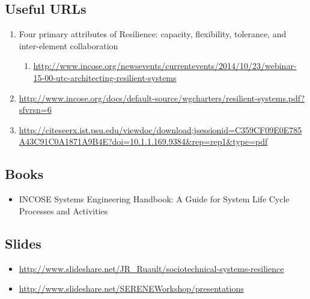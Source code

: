 \documentclass[11pt]{article}
\begin{document}
\subsection{Useful URLs}
\begin{enumerate}
	\item Four primary attributes of Resilience: capacity, flexibility, tolerance, and inter-element collaboration
	\begin{enumerate}
		\item \url{http://www.incose.org/newsevents/currentevents/2014/10/23/webinar-15-00-utc-architecting-resilient-systems}
	\end{enumerate}
	\item \url{http://www.incose.org/docs/default-source/wgcharters/resilient-systems.pdf?sfvrsn=6}
	\item \url{http://citeseerx.ist.psu.edu/viewdoc/download;jsessionid=C359CF09E0E785A43C91C0A1871A9B4E?doi=10.1.1.169.9384&rep=rep1&type=pdf}
\end{enumerate}

\subsection{Books}
\begin{itemize}
\item INCOSE Systems Engineering Handbook: A Guide for System Life Cycle Processes and Activities
\end{itemize}

\subsection{Slides}
\begin{itemize}
	\item \url{http://www.slideshare.net/JR_Ruault/sociotechnical-systems-resilience}
	\item \url{http://www.slideshare.net/SERENEWorkshop/presentations}
\end{itemize}    


 
\end{document}
